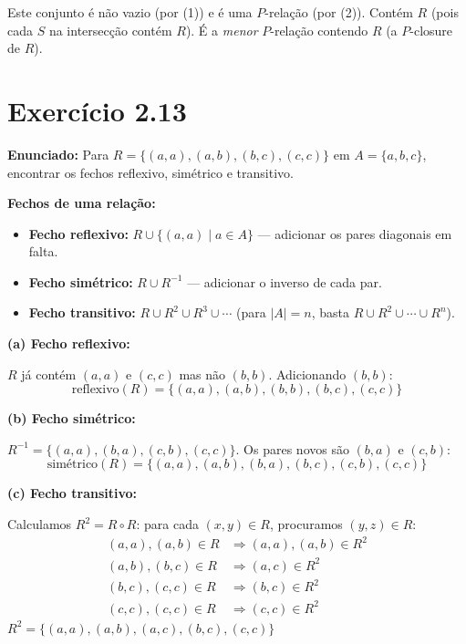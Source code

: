 \documentclass[12pt,a4paper]{article}
\begin{document}
Este conjunto é não vazio (por (1)) e é uma $P$-relação (por (2)). Contém $R$ (pois cada $S$ na intersecção contém $R$). É a \emph{menor} $P$-relação contendo $R$ (a $P$-closure de $R$).

\section*{Exercício 2.13}

\textbf{Enunciado:} Para $R = \{(a,a),(a,b),(b,c),(c,c)\}$ em $A = \{a,b,c\}$, encontrar os fechos reflexivo, simétrico e transitivo.

\begin{teoribox}
\textbf{Fechos de uma relação:}
\begin{itemize}
  \item \textbf{Fecho reflexivo:} $R \cup \{(a,a) \mid a \in A\}$ --- adicionar os pares diagonais em falta.
  \item \textbf{Fecho simétrico:} $R \cup R^{-1}$ --- adicionar o inverso de cada par.
  \item \textbf{Fecho transitivo:} $R \cup R^2 \cup R^3 \cup \cdots$ (para $|A| = n$, basta $R \cup R^2 \cup \cdots \cup R^n$).
\end{itemize}
\end{teoribox}

\textbf{(a) Fecho reflexivo:}

$R$ já contém $(a,a)$ e $(c,c)$ mas não $(b,b)$. Adicionando $(b,b)$:
\[
\text{reflexivo}(R) = \{(a,a),(a,b),(b,b),(b,c),(c,c)\}
\]

\textbf{(b) Fecho simétrico:}

$R^{-1} = \{(a,a),(b,a),(c,b),(c,c)\}$. Os pares novos são $(b,a)$ e $(c,b)$:
\[
\text{simétrico}(R) = \{(a,a),(a,b),(b,a),(b,c),(c,b),(c,c)\}
\]

\textbf{(c) Fecho transitivo:}

Calculamos $R^2 = R \circ R$: para cada $(x,y) \in R$, procuramos $(y,z) \in R$:
\begin{align*}
(a,a),(a,b) \in R &\Rightarrow (a,a),(a,b) \in R^2 \\
(a,b),(b,c) \in R &\Rightarrow (a,c) \in R^2 \\
(b,c),(c,c) \in R &\Rightarrow (b,c) \in R^2 \\
(c,c),(c,c) \in R &\Rightarrow (c,c) \in R^2
\end{align*}
$R^2 = \{(a,a),(a,b),(a,c),(b,c),(c,c)\}$
\end{document}
